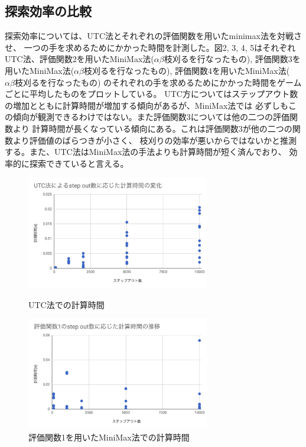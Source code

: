 \documentclass[uplatex]{jsarticle}
\begin{document}
\subsection{探索効率の比較}
探索効率については、UTC法とそれぞれの評価関数を用いたminimax法を対戦させ、
一つの手を求めるためにかかった時間を計測した。図2, 3, 4, 5はそれぞれ
UTC法、評価関数2を用いたMiniMax法($\alpha \beta 枝刈るを行なったもの$),
評価関数3を用いたMiniMax法($\alpha \beta 枝刈るを行なったもの$),
評価関数4を用いたMiniMax法($\alpha \beta 枝刈るを行なったもの$)
のそれぞれの手を求めるためにかかった時間をゲームごとに平均したものをプロットしている。
UTC方についてはステップアウト数の増加とともに計算時間が増加する傾向があるが、MiniMax法では
必ずしもこの傾向が観測できるわけではない。また評価関数3については他の二つの評価関数より
計算時間が長くなっている傾向にある。これは評価関数3が他の二つの関数より評価値のばらつきが小さく、
枝刈りの効率が悪いからではないかと推測する。また、UTC法はMiniMax法の手法よりも計算時間が短く済んでおり、
効率的に探索できていると言える。

\begin{figure}[htbp]
\begin{minipage}{0.5\hsize}
 \begin{center}
  \includegraphics[width=80mm]{img/calc_time_1.png}
 \end{center}
 \caption{UTC法での計算時間}
 \label{fig:one}
\end{minipage}
\begin{minipage}{0.5\hsize}
 \begin{center}
  \includegraphics[width=80mm]{img/calc_time_2.png}
 \end{center}
 \caption{評価関数1を用いたMiniMax法での計算時間}
 \label{fig:two}
\end{minipage}
\end{figure}
\end{document}
